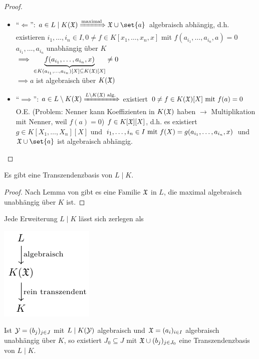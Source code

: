 \begin{proof}
	\begin{itemize}
		\item ``$\Longleftarrow$'': $a \in L \mid K(\Halb) \xRightarrow{\text{maximal}} \Halb \cup \set{a}$ algebraisch abhängig, d.h. existieren $i_1, \dots, i_n \in I, 0 \neq f \in K[x_1, \dots, x_n, x]$ mit $f(a_{i_1}, \dots, a_{i_n}, a) = 0$\\ 
		$a_{i_1}, \dots, a_{i_n}$ unabhängig über $K$\\
		$\implies \underbrace{f(a_{i_1}, \dots, a_{i_n}, x)}_{\in K(a_{i_1}, \dots, a_{i_n})[X]\subseteq K(\Halb)[X]}\neq 0$\\
		$\implies a$ ist algebraisch über $K(\Halb)$
		\item ``$\implies$'': $a \in L\setminus K(\Halb) \xRightarrow{L \setminus K(\Halb) \text{ alg.}}$ existiert $0 \neq f \in K(\Halb)[X] \mit f(a) = 0$\\
		O.E. (Problem: Nenner kann Koeffizienten in $K(\Halb)$ haben $\to$ Multiplikation mit Nenner, weil $f(a) =0$) $f \in K[\Halb][X]$, d.h. es existiert $g \in K[X_1, \dots, X_n][X]$ und $i_1,\dots, i_n \in I \mit f(X) = g(a_{i_1},\dots, a_{i_n}, x)$ und $\Halb \cup \set{a}$ ist algebraisch abhängig.
	\end{itemize}
\end{proof}
\begin{proposition}
	Es gibt eine Transzendenzbasis von $L\mid K$.
\end{proposition}
\begin{proof}
	Nach Lemma von  gibt es eine Familie $\Halb$ in $L$, die maximal algebraisch unabhängig über $K$ ist.
\end{proof}
\begin{conclusion}
	Jede Erweiterung $L\mid K$ lässt sich zerlegen als
\begin{center} %
	\includegraphics{./tikz/lemma_1_5_10.pdf}
\end{center}
\end{conclusion}
\begin{lemma}
	Ist $\caly = (b_j)_{j \in J}$ mit $L\mid K(\caly)$ algebraisch und $\Halb = (a_i)_{i\in I}$ algebraisch unabhängig über $K$, so existiert $J_0 \subseteq J$ mit $\Halb \cup (b_j)_{j \in J_0}$ eine Transzendenzbasis von $L \mid K$.
\end{lemma}
